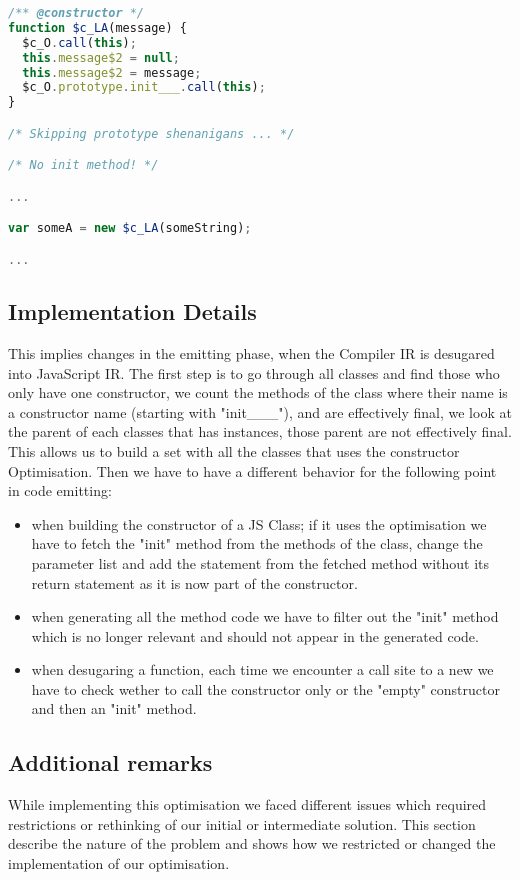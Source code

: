 \begin{lstlisting}[language=javascript,caption=Generated JavaScript with
constructor optimisation., label={lst:ctorOptJS}]
/** @constructor */
function $c_LA(message) {
  $c_O.call(this);
  this.message$2 = null;
  this.message$2 = message;
  $c_O.prototype.init___.call(this);
}

/* Skipping prototype shenanigans ... */

/* No init method! */

...

var someA = new $c_LA(someString);

...

\end{lstlisting}

\subsection{Implementation Details}
This implies changes in the emitting phase, when the Compiler IR is desugared
into JavaScript IR. The first step is to go through all classes and find those
who only have one constructor, we count the methods of the class where their
name is a constructor name (starting with "init\_\_\_"), and are effectively
final, we look at the parent of each classes that has instances, those parent
are not effectively final. This allows us to build a set with all the classes
that uses the constructor Optimisation. Then we have to have a different
behavior for the following point in code emitting:
\begin{itemize}
\item when building the constructor of a JS Class; if it uses the optimisation
we have to fetch the "init" method from the methods of the class, change the
parameter list and add the statement from the fetched method without its return
statement as it is now part of the constructor.
\item when generating all the method code we have to filter out the "init"
method which is no longer relevant and should not appear in the generated code.
\item when desugaring a function, each time we encounter a call site to a new
we have to check wether to call the constructor only or the "empty" constructor
and then an "init" method.
\end{itemize}

\subsection{Additional remarks}
While implementing this optimisation we faced different issues which required
restrictions or rethinking of our initial or intermediate solution. This
section describe the nature of the problem and shows how we restricted or
changed the implementation of our optimisation.


